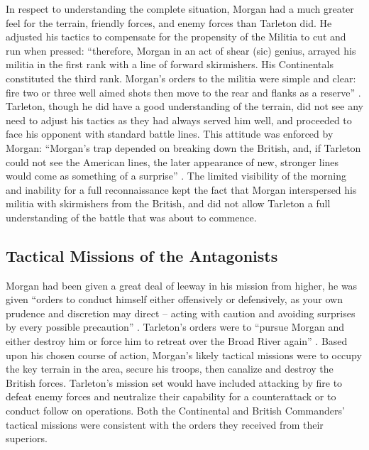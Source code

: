 In respect to understanding the complete situation, Morgan had a much greater
feel for the terrain, friendly forces, and enemy forces than Tarleton did.  He
adjusted his tactics to compensate for the propensity of the Militia to cut and
run when pressed: ``therefore, Morgan in an act of shear (sic) genius, arrayed
his militia in the first rank with a line of forward skirmishers.  His
Continentals constituted the third rank.  Morgan's orders to the militia were
simple and clear: fire two or three well aimed shots then move to the rear and
flanks as a reserve'' \cite[32]{brinkley_back_1998}. Tarleton, though he did
have a good understanding of the terrain, did not see any need to adjust his
tactics as they had always served him well, and proceeded to face his opponent
with standard battle lines.  This attitude was enforced by Morgan: ``Morgan's
trap depended on breaking down the British, and, if Tarleton could not see the
American lines, the later appearance of new, stronger lines would come as
something of a surprise'' \cite[82]{babits_devil_2001}.  The limited visibility
of the morning and inability for a full reconnaissance kept the fact that
Morgan interspersed his militia with skirmishers from the British, and did not
allow Tarleton  a full understanding of the battle that was about to commence.

\subsection{Tactical Missions of the Antagonists}

Morgan had been given a great deal of leeway in his mission from higher, he was
given ``orders to conduct himself either offensively or defensively, as your
own prudence and discretion may direct -- acting with caution and avoiding
surprises by every possible precaution'' \cite[27]{weigley_partisan_1970}.
Tarleton's orders were to ``pursue Morgan and either destroy him or force him
to retreat over the Broad River again'' \cite[30]{fleming_cowpens_1988}. Based
upon his chosen course of action, Morgan's likely tactical missions were to
occupy the key terrain in the area, secure his troops, then canalize and
destroy the British forces.  Tarleton's mission set would have included
attacking by fire to defeat enemy forces and neutralize their capability for a
counterattack or to conduct follow on operations.  Both the Continental and
British Commanders' tactical missions were consistent with the orders they
received from their superiors.
